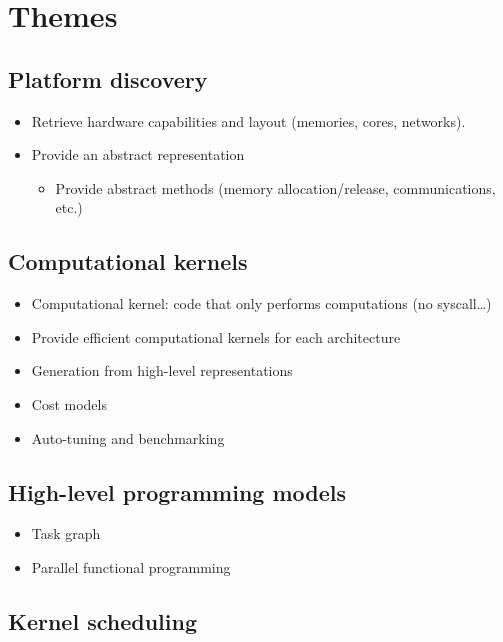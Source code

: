 \documentclass[DIV=calc, paper=a4, fontsize=11pt, twocolumn]{scrartcl}	 %
\begin{document}

\section{Themes}

\subsection{Platform discovery}

\begin{itemize}
   \item Retrieve hardware capabilities and layout (memories, cores, networks).
   \item Provide an abstract representation
   \begin{itemize}
      \item Provide abstract methods (memory allocation/release, communications, etc.)
   \end{itemize}
\end{itemize}

\subsection{Computational kernels}

\begin{itemize}
   \item Computational kernel: code that only performs computations (no
   syscall\ldots)
   \item Provide efficient computational kernels for each architecture
   \item Generation from high-level representations
   \item Cost models
   \item Auto-tuning and benchmarking
\end{itemize}

\subsection{High-level programming models}

\begin{itemize}
   \item Task graph
   \item Parallel functional programming
\end{itemize}

\subsection{Kernel scheduling}
\end{document}
